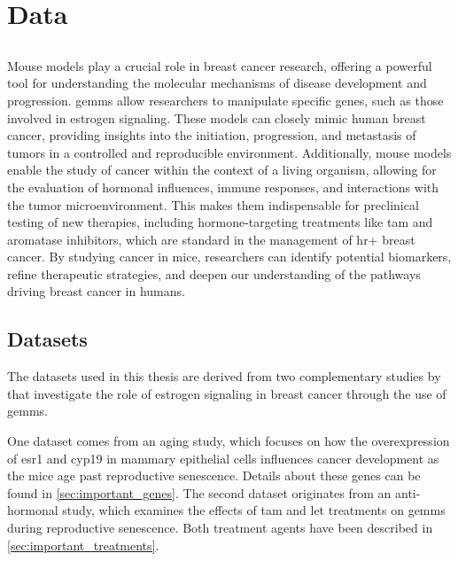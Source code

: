 \section{Data}
\label{sec:data}

\subsection{}
\label{sec:mouse_models}
Mouse models play a crucial role in breast cancer research, offering a powerful
tool for understanding the molecular mechanisms of disease development and
progression.
\Glspl{gemm} allow researchers to manipulate specific genes, such as those
involved in estrogen signaling\supercite{park_mouse_2018}.
These models can closely mimic human breast cancer, providing insights into the
initiation, progression, and metastasis of tumors in a controlled and
reproducible environment\supercite{pfefferle_transcriptomic_2013}.
Additionally, mouse models enable the study of cancer within the context of a
living organism, allowing for the evaluation of hormonal influences, immune
responses, and interactions with the tumor
microenvironment\supercite{manning_mouse_2016}.
This makes them indispensable for preclinical testing of new therapies,
including hormone-targeting treatments like \gls{tam} and aromatase inhibitors,
which are standard in the management of \gls{hr+} breast
cancer\supercite{fan_endocrine_2015,yin_disruption_2014}.
By studying cancer in mice, researchers can identify potential biomarkers,
refine therapeutic strategies, and deepen our understanding of the pathways
driving breast cancer in humans\supercite{peterson_amphiregulin_2015}.

\subsection{Datasets}
\label{sec:datasets}
The datasets used in this thesis are derived from two complementary studies by
\textcite{furth_esr1_2023,furth_overexpression_2023} that investigate the role
of estrogen signaling in breast cancer through the use of \glspl{gemm}.

One dataset comes from an aging study, which focuses on how the overexpression
of \gls{esr1} and \gls{cyp19} in mammary epithelial cells influences cancer
development as the mice age past reproductive senescence.
Details about these genes can be found in \cref{sec:important_genes}.
The second dataset originates from an anti-hormonal study, which examines the
effects of \gls{tam} and \gls{let} treatments on \glspl{gemm} during
reproductive senescence.
Both treatment agents have been described in \cref{sec:important_treatments}.

